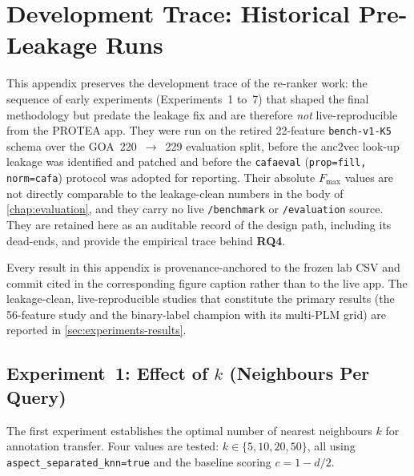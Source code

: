 \chapter{Development Trace: Historical Pre-Leakage Runs}
\label{app:dev-trace}

This appendix preserves the development trace of the re-ranker work: the
sequence of early experiments (Experiments~1 to~7) that shaped the final
methodology but predate the leakage fix and are therefore \emph{not}
live-reproducible from the PROTEA app. They were run on the retired 22-feature
\texttt{bench-v1-K5} schema over the GOA~220~$\to$~229 evaluation split, before
the anc2vec look-up leakage was identified and patched and before the
\texttt{cafaeval} (\texttt{prop=fill, norm=cafa}) protocol was adopted for
reporting. Their absolute $F_{\max}$ values are not directly comparable to the
leakage-clean numbers in the body of \cref{chap:evaluation}, and they carry no
live \texttt{/benchmark} or \texttt{/evaluation} source. They are retained here
as an auditable record of the design path, including its dead-ends, and provide
the empirical trace behind \textbf{RQ4}.

Every result in this appendix is provenance-anchored to the frozen lab CSV and
commit cited in the corresponding figure caption rather than to the live app.
The leakage-clean, live-reproducible studies that constitute the primary
results (the 56-feature study and the binary-label champion with its multi-PLM
grid) are reported in \cref{sec:experiments-results}.

\section[Experiment~1: Effect of k (Neighbours Per Query)]{Experiment~1: Effect of $k$ (Neighbours Per Query)}
\label{subsec:exp1-k}

The first experiment establishes the optimal number of nearest neighbours $k$
for annotation transfer. Four values are tested: $k \in \{5, 10, 20, 50\}$,
all using \texttt{aspect\_separated\_knn=true} and the baseline scoring
$c = 1 - d/2$.


